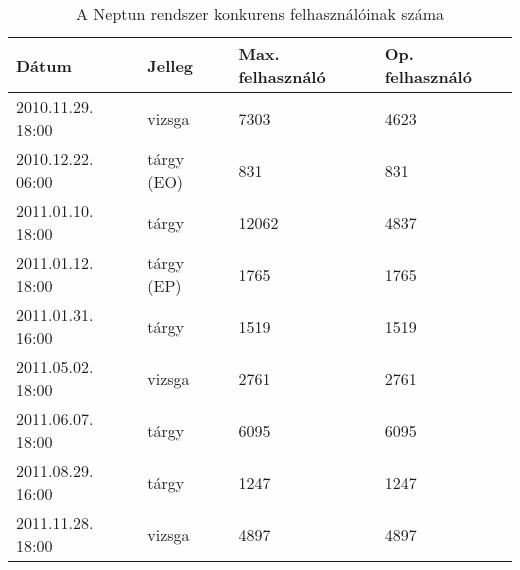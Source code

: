\begin{table}[h]
	\caption{A Neptun rendszer konkurens felhasználóinak száma}
	\centering
	\small
	\begin{tabular}{| p{3.0cm} | p{2.0cm} | p{3.0cm} | p{3.0cm} |}
		\hline
		\rowcolor{MyTableColor} \textbf{Dátum} & \textbf{Jelleg} & \textbf{Max. felhasználó} & \textbf{Op. felhasználó} \\
		\hline
		2010.11.29. 18:00 & vizsga & 7303 & 4623 \\
		\hline
		2010.12.22. 06:00 & tárgy (EO) & 831 & 831 \\
		\hline
		2011.01.10. 18:00 & tárgy & 12062 & 4837 \\
		\hline
		2011.01.12. 18:00 & tárgy (EP) & 1765 & 1765 \\
		\hline
		2011.01.31. 16:00 & tárgy & 1519 & 1519 \\
		\hline
		2011.05.02. 18:00 & vizsga & 2761 & 2761 \\
		\hline
		2011.06.07. 18:00 & tárgy & 6095 & 6095 \\
		\hline
		2011.08.29. 16:00 & tárgy & 1247 & 1247 \\
		\hline
		2011.11.28. 18:00 & vizsga & 4897 & 4897 \\
		\hline
	\end{tabular}
	\normalsize
	\label{tab:neptunusers}
\end{table}
